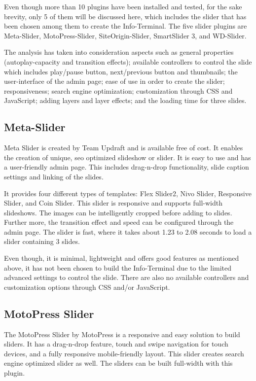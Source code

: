 Even though more than 10 plugins have been installed and tested, for the sake brevity, only 5 of them will be discussed here, which includes the slider that has been chosen among them to create the Info-Terminal. The five slider plugins are Meta-Slider, MotoPress-Slider, SiteOrigin-Slider, SmartSlider 3, and WD-Slider.

The analysis has taken into consideration aspects such as general properties (autoplay-capacity and transition effects); available controllers to control the slide which includes play/pause button, next/previous button and thumbnails; the user-interface of the admin page; ease of use in order to create the slider; responsiveness; search engine optimization; customization through CSS and JavaScript; adding layers and layer effects; and the loading time for three slides.

\subsection{Meta-Slider}
Meta Slider \cite{TeamUpdraft.2016}\cite{TeamUpdraft.2016b} is created by Team Updraft and is available free of cost. It enables the creation of unique, \ac{seo} optimized slideshow or slider. It is easy to use and has a user-friendly admin page. This includes drag-n-drop functionality, slide caption settings and linking of the slides.

It provides four different types of templates: Flex Slider2, Nivo Slider, Responsive Slider, and Coin Slider. This slider is responsive and supports full-width slideshows. The images can be intelligently cropped before adding to slides. Further more, the transition effect and speed can be configured through the admin page. The slider is fast, where it takes about 1.23 to 2.08 seconds to load a slider containing 3 slides.

Even though, it is minimal, lightweight and offers good features as mentioned above, it has not been chosen to build the Info-Terminal due to the limited advanced settings to control the slide. There are also no available controllers and customization options through CSS and/or JavaScript.

\subsection{MotoPress Slider}
The MotoPress Slider \cite{MotoPress.2015}\cite{MotoPress.2016} by MotoPress is a responsive and easy solution to build sliders. It has a drag-n-drop feature, touch and swipe navigation for touch devices, and a fully responsive mobile-friendly layout. This slider creates search engine optimized slider as well. The sliders can be built full-width with this plugin.

